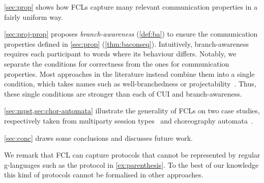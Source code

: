 \cref{sec:prop} shows how FCLs capture many relevant communication
properties in a fairly uniform way.
%

\cref{sec:proj-prop} proposes \emph{branch-awareness} (\cref{def:ba})
to ensure the communication properties defined in \cref{sec:prop} (\cref{thm:baconseq}).
%
Intuitively, branch-awareness requires each participant to
 words where its behaviour differs.
%
Notably, we separate the conditions for correctness from the ones for communication properties. Most approaches in the literature instead combine them into a single condition, which takes names such as well-branchedness or projectability~\cite{hlvlcmmprttz16}.
Thus, these single conditions are stronger than each of CUI and branch-awareness.
%

\cref{sec:mpst,sec:chor-automata} illustrate the generality of FCLs on
two case studies, respectively taken from multiparty session types~\cite{SeveriD19} and
choreography automata~\cite{blt20}.

\cref{sec:conc} draws some conclusions and discusses future work.

We remark that FCL can capture protocols that cannot be represented by
regular g-languages such as the  protocol in
\cref{ex:parenthesis}.
%
To the best of our knowledge this kind of protocols cannot be formalised in other approaches.

